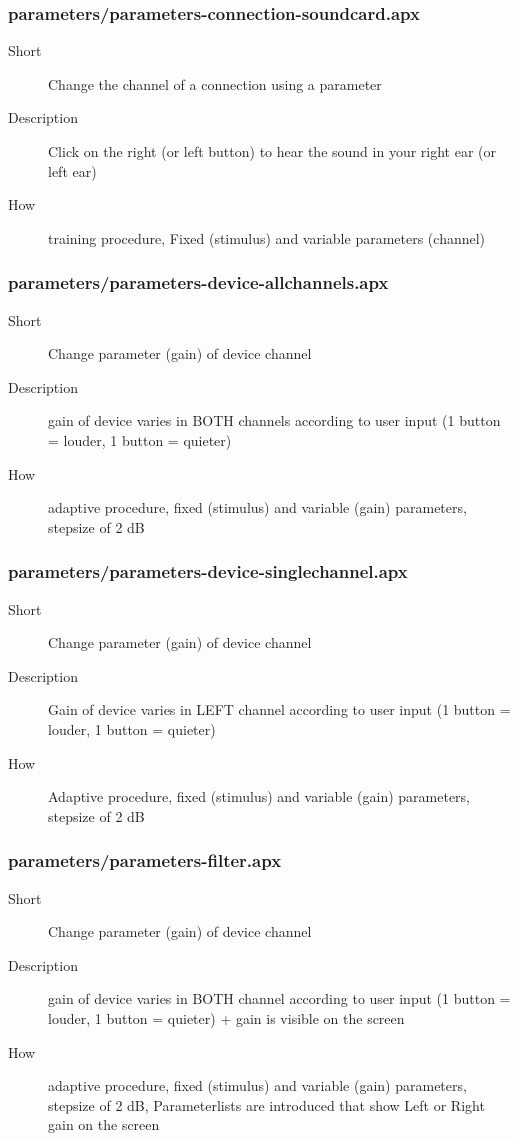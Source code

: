 \subsubsection{parameters/parameters-connection-soundcard.apx}
\begin{description}
\item[Short] 
 Change the channel of a connection using a parameter
\item[Description] 
 Click on the right (or left button) to hear the sound in your right ear (or left ear)
\item[How] 
 training procedure, Fixed (stimulus) and variable parameters (channel)
\end{description}

\subsubsection{parameters/parameters-device-allchannels.apx}
\begin{description}
\item[Short] 
 Change parameter (gain) of device channel
\item[Description] 
 gain of device varies in BOTH channels according to user input (1 button = louder, 1 button = quieter)
\item[How] 
 adaptive procedure, fixed (stimulus) and variable (gain) parameters, stepsize of 2 dB
\end{description}

\subsubsection{parameters/parameters-device-singlechannel.apx}
\begin{description}
\item[Short] 
 Change parameter (gain) of device channel
\item[Description] 
 Gain of device varies in LEFT channel according to user input (1 button = louder, 1 button = quieter)
\item[How] 
 Adaptive procedure, fixed (stimulus) and variable (gain) parameters, stepsize of 2 dB
\end{description}

\subsubsection{parameters/parameters-filter.apx}
\begin{description}
\item[Short] 
 Change parameter (gain) of device channel
\item[Description] 
 gain of device varies in BOTH channel according to user input (1 button = louder, 1 button = quieter) + gain is visible on the screen
\item[How] 
 adaptive procedure, fixed (stimulus) and variable (gain) parameters, stepsize of 2 dB, Parameterlists are introduced that show Left or Right gain on the screen
\end{description}

